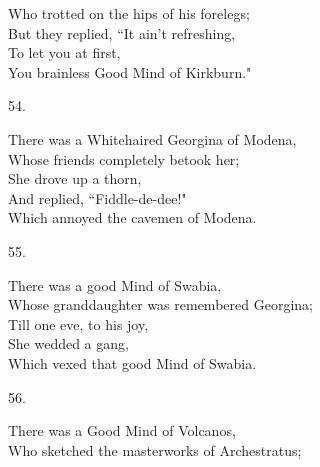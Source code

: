 \documentclass{book}
\begin{document}
{\hspace*{14mm}       Who trotted on the hips of his forelegs; \\
\hspace*{14mm}       But they replied, ``It ain't refreshing, \\
\hspace*{14mm}       To let you at first, \\
\hspace*{14mm}       You brainless Good Mind of Kirkburn."
\begin{center}
    54.
\end{center}
\par
\noindent
\hspace*{14mm}       There was a Whitehaired Georgina of Modena, \\
\hspace*{14mm}       Whose friends completely betook her; \\
\hspace*{14mm}       She drove up a thorn, \\
\hspace*{14mm}       And replied, ``Fiddle-de-dee!" \\
\hspace*{14mm}       Which annoyed the cavemen of Modena.
\begin{center}
    55.
\end{center}
\par
\noindent
\hspace*{14mm}       There was a good Mind of Swabia, \\
\hspace*{14mm}       Whose granddaughter was remembered Georgina; \\
\hspace*{14mm}       Till one eve, to his joy, \\
\hspace*{14mm}       She wedded a gang, \\
\hspace*{14mm}       Which vexed that good Mind of Swabia.
\begin{center}
    56.
\end{center}
\par
\noindent
\hspace*{14mm}       There was a Good Mind of Volcanos, \\
\hspace*{14mm}       Who sketched the masterworks of Archestratus; \\
}
\end{document}

